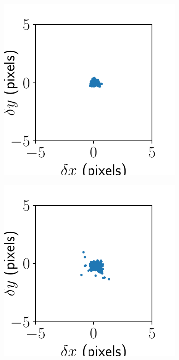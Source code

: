 \documentclass{article}
\begin{document}
\begin{figure}[ht]
\begin{subfigure}{0.24\linewidth}
		\caption{}
		\label{fig:alignmentresultAKY1}
	\end{subfigure}
	\begin{subfigure}{0.24\linewidth}
		\includegraphics[width=\linewidth]{stitch-result-AKY-4.pdf}
		\caption{}
		\label{fig:stitchresultAKY4}
	\end{subfigure}
	\begin{subfigure}{0.24\linewidth}
		\includegraphics[width=\linewidth]{stitch-result-AKY-3.pdf}

\end{subfigure}
\end{figure}
\end{document}
